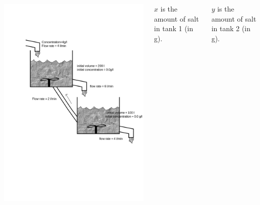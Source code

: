 \begin{frame}
\begin{columns}
    {\includegraphics[width=1.5\textwidth]{img/introLinearAlgebraTankProblem}}   

    $x$ is the amount of salt in tank 1 (in g).

    $y$ is the amount of salt in tank 2 (in g).
    \vspace{3cm}
  \end{columns}
\end{frame}

